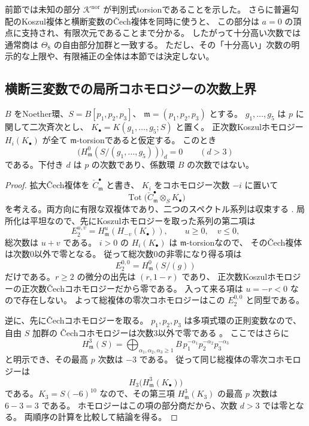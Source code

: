 前節では未知の部分 $\mathcal K^{\mathrm{nor}}$ が判別式torsionであることを示した。
さらに普遍勾配のKoszul複体と横断変数の\v{C}ech複体を同時に使うと、
この部分は $a=0$ の頂点に支持され、有限次元であることまで分かる。
したがって十分高い次数では通常商は $\Theta_8$ の自由部分加群と一致する。
ただし、その「十分高い」次数の明示的な上限や、有限補正の全体は本節では決定しない。

\subsection{横断三変数での局所コホモロジーの次数上界}

\begin{lemma}
\label{lem:v17-cech-koszul-normal-degree-bound}
$B$ をNoether環、$S=B[p_1,p_2,p_3]$、
$\mathfrak m=(p_1,p_2,p_3)$ とする。
$g_1,\ldots,g_5$ は $p$ に関して二次斉次とし、
$K_\bullet=K(g_1,\ldots,g_5;S)$ と置く。
正次数Koszulホモロジー $H_i(K_\bullet)$ が全て
$\mathfrak m$-torsionであると仮定する。
このとき
\begin{equation}\label{eq:v17-local-torsion-degree-bound}
 \bigl(H^0_{\mathfrak m}(S/(g_1,\ldots,g_5))\bigr)_d=0
 \qquad(d>3)
\end{equation}
である。下付き $d$ は $p$ の次数であり、係数環 $B$ の次数ではない。
\end{lemma}

\begin{proof}
拡大\v{C}ech複体を $\check C^\bullet_{\mathfrak m}$ と書き、
$K_i$ をコホモロジー次数 $-i$ に置いて
\[
 \operatorname{Tot}
  \bigl(\check C^\bullet_{\mathfrak m}\otimes_S K_\bullet\bigr)
\]
を考える。両方向に有限な双複体であり、二つのスペクトル系列は収束する
\cite[Tag 012X, Lemmas 12.25.1 and 12.25.3]{StacksCechKoszul}.
局所化は平坦なので、先にKoszulホモロジーを取った系列の第二項は
\[
 E_2^{u,v}=H^u_{\mathfrak m}(H_{-v}(K_\bullet)),
 \qquad u\ge0,\quad v\le0,
\]
総次数は $u+v$ である。
$i>0$ の $H_i(K_\bullet)$ は $\mathfrak m$-torsionなので、
その\v{C}ech複体は次数0以外で零となる。
従って総次数0の非零になり得る項は
\[
 E_2^{0,0}=H^0_{\mathfrak m}(S/(g))
\]
だけである。$r\ge2$ の微分の出先は $(r,1-r)$ であり、
正次数Koszulホモロジーの正次数\v{C}echコホモロジーだから零である。
入って来る項は $u=-r<0$ なので存在しない。
よって総複体の零次コホモロジーはこの $E_2^{0,0}$ と同型である。

逆に、先に\v{C}echコホモロジーを取る。
$p_1,p_2,p_3$ は多項式環の正則変数なので、自由 $S$ 加群の
\v{C}echコホモロジーは次数3以外で零である
\cite[Tag 0G6L]{StacksCechKoszul}。
ここではさらに
\[
 H^3_{\mathfrak m}(S)
  =\bigoplus_{\alpha_1,\alpha_2,\alpha_3\ge1}
       B\,p_1^{-\alpha_1}p_2^{-\alpha_2}p_3^{-\alpha_3}
\]
と明示でき、その最高 $p$ 次数は $-3$ である。
従って同じ総複体の零次コホモロジーは
\[
 H_3\bigl(H^3_{\mathfrak m}(K_\bullet)\bigr)
\]
である。$K_3=S(-6)^{10}$ なので、その第三項
$H^3_{\mathfrak m}(K_3)$ の最高 $p$ 次数は $6-3=3$ である。
ホモロジーはこの項の部分商だから、次数 $d>3$ では零となる。
両順序の計算を比較して結論を得る。
\end{proof}

